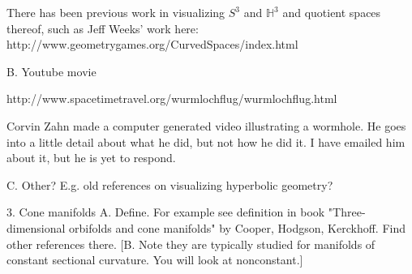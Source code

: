 \documentclass[12pt]{amsart}
\begin{document}
There has been previous work in visualizing $S^3$ and $\mathbb{H}^3$ and quotient spaces thereof, such as Jeff Weeks' work here: http://www.geometrygames.org/CurvedSpaces/index.html

  B.  Youtube movie

http://www.spacetimetravel.org/wurmlochflug/wurmlochflug.html

Corvin Zahn made a computer generated video illustrating a wormhole. He goes into a little detail about what he did, but not how he did it. I have emailed him about it, but he is yet to respond.

  C.  Other?  E.g. old references on visualizing hyperbolic geometry?

3.  Cone manifolds
  A.  Define.  For example see definition in book "Three-dimensional orbifolds and cone manifolds" by Cooper, Hodgson, Kerckhoff.  Find other references there.
  [B.  Note they are typically studied for manifolds of constant sectional curvature.  You will look at nonconstant.]



\end{document}
